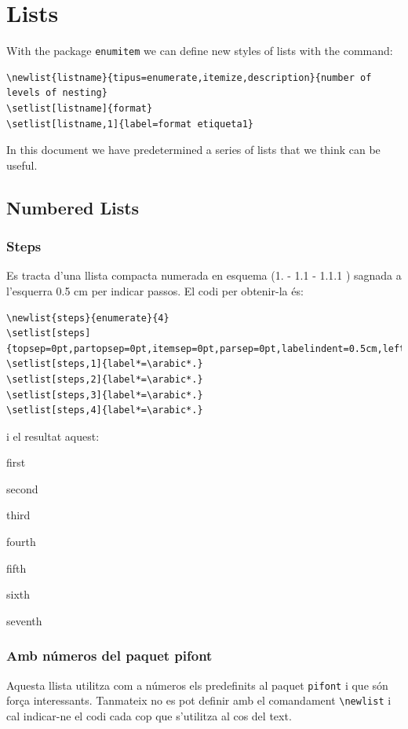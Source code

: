 \documentclass[a4paper,
                             twoside,
                             BCOR1.0cm,
                             DIV11,
                             parskip=full,
                             11pt]{scrbook}
\begin{document}
\section{Lists}\label{sec:lists}
With the package \verb+enumitem+ we can define new styles of lists with the command:
\begin{tiny}
\begin{verbatim}
\newlist{listname}{tipus=enumerate,itemize,description}{number of levels of nesting} 
\setlist[listname]{format}
\setlist[listname,1]{label=format etiqueta1}
\end{verbatim}
\end{tiny}

In this document we have predetermined a series of lists that we think can be useful.

\subsection{Numbered Lists}\label{sbsec:listnum}
\subsubsection{Steps}\label{ssbsec:steps}
Es tracta d'una llista compacta numerada en esquema (1. - 1.1 - 1.1.1 ) sagnada a l'esquerra 0.5 cm per indicar passos. El codi per obtenir-la és:
\begin{tiny}
\begin{verbatim}
\newlist{steps}{enumerate}{4}
\setlist[steps]{topsep=0pt,partopsep=0pt,itemsep=0pt,parsep=0pt,labelindent=0.5cm,leftmargin=*}
\setlist[steps,1]{label*=\arabic*.}
\setlist[steps,2]{label*=\arabic*.}
\setlist[steps,3]{label*=\arabic*.}
\setlist[steps,4]{label*=\arabic*.}
\end{verbatim}
\end{tiny}
i el resultat aquest:
\begin{steps}
\item first
\item second
\item third
\item fourth
\item fifth
\item sixth
\item seventh
\end{steps}
\subsubsection{Amb números del paquet pifont}\label{ssbsec:pifont}
Aquesta llista utilitza com a números els predefinits al paquet \verb+pifont+ i que són força interessants. Tanmateix no es pot definir amb el comandament \verb+\newlist+ i cal indicar-ne el codi cada cop que s'utilitza al cos del text.
\end{document}
